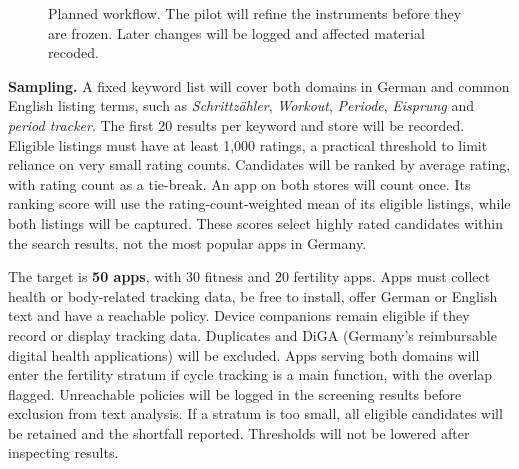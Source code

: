 \documentclass[sigconf,nonacm,natbib=false]{acmart}
\begin{document}
\begin{figure}[t]
\centering
{}
\caption{Planned workflow. The pilot will refine the instruments before they
are frozen. Later changes will be logged and affected material recoded.}
\label{fig:pipeline}
\end{figure}

\textbf{Sampling.} A fixed keyword list will cover both domains in German
and common English listing terms, such as \emph{Schrittzähler}, \emph{Workout},
\emph{Periode}, \emph{Eisprung} and \emph{period tracker}. The first 20 results
per keyword and store will be recorded. Eligible listings must have at least
1{,}000 ratings, a practical threshold to limit reliance on very small rating
counts. Candidates will be ranked by average rating, with rating count as a
tie-break. An app on both stores will count once. Its ranking score will use
the rating-count-weighted mean of its eligible listings, while both listings
will be captured. These scores select highly rated candidates within the
search results, not the most popular apps in Germany.

The target is \textbf{50 apps}, with 30 fitness and 20 fertility apps. Apps
must collect health or body-related tracking data, be free to install, offer
German or English text and have a reachable policy. Device companions remain
eligible if they record or display tracking data. Duplicates and DiGA
(Germany's reimbursable digital health applications) will be excluded. Apps serving both domains will enter the fertility stratum if cycle
tracking is a main function, with the overlap flagged. Unreachable policies
will be logged in the screening results before exclusion from text analysis.
If a stratum is too small, all eligible candidates will be retained and the
shortfall reported. Thresholds will not be lowered after inspecting results.
\end{document}
